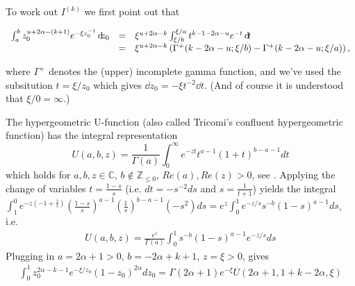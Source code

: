 \vspace{1em}

\noindent
To work out $I^{(k)}$ we first point out that

\[ \begin{array}{rcl} 
\int_a^b z_0^{u+2\alpha-(k+1)} e^{-\xi z_0^{-1}} {\operatorname{\, \mathrm{d}\hspace{-2pt}}} z_0
& = & 
\xi^{u+2\alpha-k} \int_{\xi/b}^{\xi/a} t^{k-1-2\alpha-u} e^{-t} {\operatorname{\, \mathrm{d}\hspace{-2pt}}} t \\
& = & 
\xi^{u+2\alpha-k} \left( \Gamma^+( k-2\alpha-u;\xi/{{\color{black} b}}) - \Gamma^+( k-2\alpha-u; \xi/{{\color{black} a}}) \right), 
\end{array} \]

\noindent
where $\Gamma^+$ denotes the (upper) incomplete gamma function, and we've used the subsitution
$t = \xi / z_0$ which gives ${\dd} z_0 = -\xi t^{-2} {\dd} t$. (And of course it is understood that 
$\xi/0 = \infty$.)



The hypergeometric U-function 
(also called Tricomi's confluent hypergeometric function) has the integral representation 
$$U(a,b,z) = \frac{1}{\Gamma(a)} \int_0^\infty e^{-zt} t^{a-1} (1+t)^{b-a-1} dt$$ which holds for $a,b,z\in \mathbb{C}$, $b \not \in \mathbb{Z}_{\leq 0}$, $Re(a), Re(z) >0$, see \cite[p.255]{Erdelyi1953}. Applying the change of variables 
$t=\frac{1-s}{s}$ (i.e. $dt = -s^{-2} ds$ and $s = \frac{1}{t+1}$) yields the integral 
$\int_1^0 e^{-z(-1+\frac{1}{s})} (\frac{1-s}{s})^{a-1} (\frac{1}{s})^{b-a-1} (-s^2)ds = e^z\int_0^1 e^{-z/s} s^{-b}(1-s)^{a-1} ds$, i.e.
\begin{align*}
U(a,b,z) = \frac{e^z}{\Gamma(a)} \int_0^1 s^{-b} (1-s)^{a-1} e^{-z/s} ds
\end{align*}
Plugging in $a=2\alpha+1 >0$, $b=-2\alpha+k+1$, $z=\xi>0$, gives
\begin{align*}
\int_0^1 z_0^{2\alpha-k-1} e^{-\xi/z_0} (1-z_0)^{2\alpha} dz_0 = \Gamma(2\alpha+1)e^{-\xi} U(2\alpha+1,1+k-2\alpha,\xi)
\end{align*}

